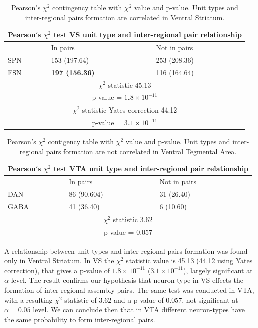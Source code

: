 \begin{table}[H]
\begin{tabular}{ |p{3cm}|p{3cm}|p{3cm}| }
 \hline
 \multicolumn{3}{|c|}{Pearson$'$s $\chi^2$ test VS unit type and inter-regional pair relationship} \\
 \hline
 & In pairs & Not in pairs\\
 \hline
 SPN & 153 (197.64) & 253 (208.36) \\
 \hline
 FSN & \textbf{197 (156.36)} & 116 (164.64)\\
 \hline
 \multicolumn{3}{|c|}{$\chi^2$ statistic  45.13}\\
 \multicolumn{3}{|c|}{p-value = $1.8\times10^{-11}$}\\
 \hline
 \multicolumn{3}{|c|}{$\chi^2$ statistic Yates correction 44.12}\\
 \multicolumn{3}{|c|}{p-value = $3.1\times10^{-11}$}\\
 \hline
\end{tabular}
\caption{Pearson$'$s $\chi^2$ contingency table with $\chi^2$ value and p-value. Unit types and inter-regional pairs formation are correlated in Ventral Striatum.}
\label{tab:chi2_asnotasVS}
\end{table}
\begin{table}[H]
\begin{tabular}{ |p{3cm}|p{3cm}|p{3cm}| }
 \hline
 \multicolumn{3}{|c|}{Pearson$'$s $\chi^2$ test VTA unit type and inter-regional pair relationship} \\
 \hline
 & In pairs & Not in pairs\\
 \hline
 DAN & 86 (90.604) & 31 (26.40) \\
 \hline
 GABA & 41 (36.40) & 6 (10.60)\\
 \hline
 \multicolumn{3}{|c|}{$\chi^2$ statistic  3.62}\\
 \multicolumn{3}{|c|}{p-value = 0.057}\\
 \hline
\end{tabular}
\caption{Pearson$'$s $\chi^2$ contigency table with $\chi^2$ value and p-value. Unit types and inter-regional pairs formation are not correlated in Ventral Tegmental Area.}
\label{tab:chi2_asnotasVTA}
\end{table}
A relationship between unit types and inter-regional pairs formation was found only in Ventral Striatum. In VS the $\chi^2$ statistic value is 45.13 (44.12 using Yates correction), that gives a p-value of $1.8\times10^{-11}$ ($3.1\times10^{-11}$), largely significant at $\alpha$ level. The result confirms our hypothesis that neuron-type in VS effects the formation of inter-regional assembly-pairs. The same test was conducted in VTA, with a resulting $\chi^2$ statistic of $3.62$ and a p-value of $0.057$, not significant at $\alpha = 0.05$ level. We can conclude then that in VTA different neuron-types have the same probability to form inter-regional pairs.

